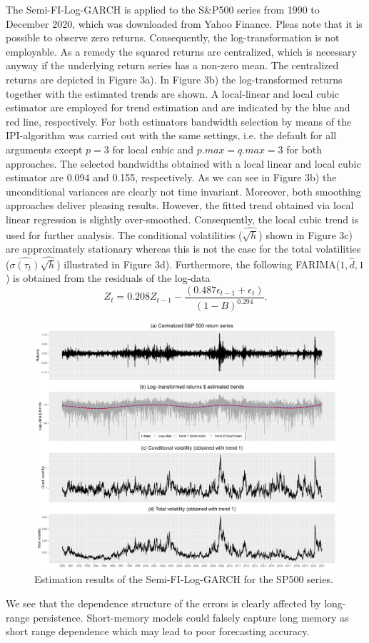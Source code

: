 \documentclass[12pt]{article}
\begin{document}
The Semi-FI-Log-GARCH is applied to the S\&P500 series from 1990 to December 2020, which was downloaded from Yahoo Finance. Pleas note that it is possible to observe zero returns. Consequently, the log-transformation is not employable. As a remedy the squared returns are centralized, which is necessary anyway if the underlying return series has a non-zero mean. The centralized returns are depicted in Figure 3a). In Figure 3b) the log-transformed returns together with the estimated trends are shown. A local-linear and local cubic estimator are employed for trend estimation and are indicated by the blue and red line, respectively. For both estimators bandwidth selection by means of the IPI-algorithm was carried out with the same settings, i.e. the default for all arguments except $\textit{p} = 3$ for local cubic and $\textit{p.max} = \textit{q.max} = 3$ for both approaches. The selected bandwidths obtained with a local linear and local cubic estimator are 0.094 and 0.155, respectively. As we can see in Figure 3b) the unconditional variances are clearly not time invariant. Moreover, both smoothing approaches deliver pleasing results. However, the fitted trend obtained via local linear regression is slightly over-smoothed. Consequently, the local cubic trend is used for further analysis. The conditional volatilities ($\hat{\sqrt{h}}$) shown in Figure 3c) are approximately stationary whereas this is not the case for the total volatilities ($\hat{\sigma(\tau_t)}\hat{\sqrt{h}}$) illustrated in Figure 3d). Furthermore, the following FARIMA($1, \hat{d}, 1$) is obtained from the residuals of the log-data
\begin{equation}
	Z_t = 0.208 Z_{t-1} - \frac{(0.487 \epsilon_{t-1} + \epsilon_t)}{(1-B)^{0.294}}.
\end{equation}

\begin{figure}[h!]
	\includegraphics[trim = {0cm 0mm 0mm 0mm}, width = \textwidth]{Abb/SP500.pdf}
	\caption{Estimation results of the Semi-FI-Log-GARCH for the SP500 series.}
\end{figure}
We see that the dependence structure of the errors is clearly affected by long-range persistence. Short-memory models could falsely capture long memory as short range dependence which may lead to poor forecasting accuracy. 
\end{document}
